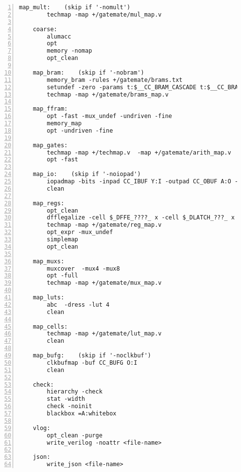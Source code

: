 \begin{lstlisting}[numbers=left,frame=single]
    map_mult:    (skip if '-nomult')
        techmap -map +/gatemate/mul_map.v

    coarse:
        alumacc
        opt
        memory -nomap
        opt_clean

    map_bram:    (skip if '-nobram')
        memory_bram -rules +/gatemate/brams.txt
        setundef -zero -params t:$__CC_BRAM_CASCADE t:$__CC_BRAM_40K_SDP t:$__CC_BRAM_20K_SDP t:$__CC_BRAM_20K_TDP t:$__CC_BRAM_40K_TDP 
        techmap -map +/gatemate/brams_map.v

    map_ffram:
        opt -fast -mux_undef -undriven -fine
        memory_map
        opt -undriven -fine

    map_gates:
        techmap -map +/techmap.v  -map +/gatemate/arith_map.v
        opt -fast

    map_io:    (skip if '-noiopad')
        iopadmap -bits -inpad CC_IBUF Y:I -outpad CC_OBUF A:O -toutpad CC_TOBUF ~T:A:O -tinoutpad CC_IOBUF ~T:Y:A:IO
        clean

    map_regs:
        opt_clean
        dfflegalize -cell $_DFFE_????_ x -cell $_DLATCH_???_ x
        techmap -map +/gatemate/reg_map.v
        opt_expr -mux_undef
        simplemap
        opt_clean

    map_muxs:
        muxcover  -mux4 -mux8
        opt -full
        techmap -map +/gatemate/mux_map.v

    map_luts:
        abc  -dress -lut 4
        clean

    map_cells:
        techmap -map +/gatemate/lut_map.v
        clean

    map_bufg:    (skip if '-noclkbuf')
        clkbufmap -buf CC_BUFG O:I
        clean

    check:
        hierarchy -check
        stat -width
        check -noinit
        blackbox =A:whitebox

    vlog:
        opt_clean -purge
        write_verilog -noattr <file-name>

    json:
        write_json <file-name>
\end{lstlisting}

